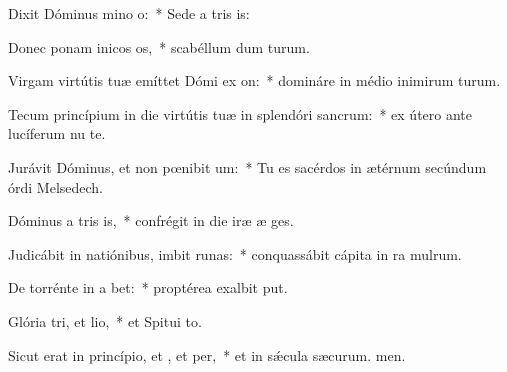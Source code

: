 \item Dixit Dóminus mino o:~* Sede a tris is:
\item Donec ponam inicos os,~* scabéllum dum turum.
\item Virgam virtútis tuæ emíttet Dómi ex on:~* domináre in médio inimirum turum.
\item Tecum princípium in die virtútis tuæ in splendóri sancrum:~* ex útero ante lucíferum nu te.
\item Jurávit Dóminus, et non pœnibit um:~* Tu es sacérdos in ætérnum secúndum órdi Melsedech.
\item Dóminus a tris is,~* confrégit in die iræ æ ges.
\item Judicábit in natiónibus, imbit runas:~* conquassábit cápita in ra mulrum.
\item De torrénte in a bet:~* proptérea exalbit put.
\item Glória tri, et lio,~* et Spitui to.
\item Sicut erat in princípio, et , et per,~* et in sǽcula sæcurum. men.
